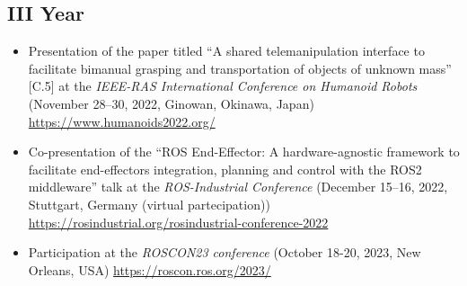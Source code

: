 \subsection{\textbf{III Year}}
\begin{itemize}
	\item Presentation of the paper titled \enquote{A shared telemanipulation interface to facilitate
	bimanual grasping and transportation of objects of unknown mass} [C.5] at the \textit{IEEE-RAS International Conference on Humanoid Robots} (November 28–30, 2022, Ginowan, Okinawa, Japan) \url{https://www.humanoids2022.org/}	
		
	\item Co-presentation of the \enquote{ROS End-Effector: A hardware-agnostic framework to facilitate end-effectors integration, planning and control with the ROS2 middleware} talk at the \textit{ROS-Industrial Conference} (December 15–16, 2022, Stuttgart, Germany (virtual partecipation)) \url{https://rosindustrial.org/rosindustrial-conference-2022}
	
	\item Participation at the \textit{ROSCON23 conference} (October 18-20, 2023, New Orleans, USA) \url{https://roscon.ros.org/2023/}
	
\end{itemize}